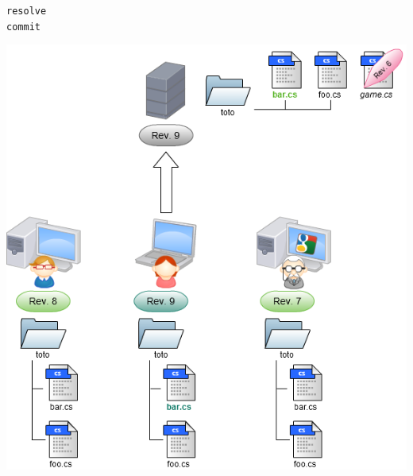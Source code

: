 \begin{frame}
  \texttt{resolve}\\
  \texttt{commit}
  \begin{center}
    \vspace{-24pt}
    \includegraphics[scale=0.3]{images/15-Resolved.png}
  \end{center}
\end{frame}

